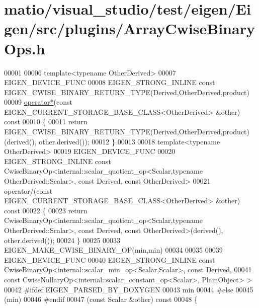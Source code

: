 \hypertarget{matio_2visual__studio_2test_2eigen_2_eigen_2src_2plugins_2_array_cwise_binary_ops_8h_source}{}\section{matio/visual\+\_\+studio/test/eigen/\+Eigen/src/plugins/\+Array\+Cwise\+Binary\+Ops.h}
\label{matio_2visual__studio_2test_2eigen_2_eigen_2src_2plugins_2_array_cwise_binary_ops_8h_source}

\begin{DoxyCode}
00001 
00006 \textcolor{keyword}{template}<\textcolor{keyword}{typename} OtherDerived>
00007 EIGEN\_DEVICE\_FUNC
00008 EIGEN\_STRONG\_INLINE \textcolor{keyword}{const} EIGEN\_CWISE\_BINARY\_RETURN\_TYPE(Derived,OtherDerived,product)
00009 \hyperlink{group___geometry___module_ga8f79e131479dbe709ee1173b1be9a8f0}{operator*}(\textcolor{keyword}{const} EIGEN\_CURRENT\_STORAGE\_BASE\_CLASS<OtherDerived> &other)\textcolor{keyword}{ const}
00010 \textcolor{keyword}{}\{
00011   \textcolor{keywordflow}{return} EIGEN\_CWISE\_BINARY\_RETURN\_TYPE(Derived,OtherDerived,product)(derived(), other.derived());
00012 \}
00013 
00018 \textcolor{keyword}{template}<\textcolor{keyword}{typename} OtherDerived>
00019 EIGEN\_DEVICE\_FUNC
00020 EIGEN\_STRONG\_INLINE \textcolor{keyword}{const} CwiseBinaryOp<internal::scalar\_quotient\_op<Scalar,typename OtherDerived::Scalar>,
       \textcolor{keyword}{const} Derived, \textcolor{keyword}{const} OtherDerived>
00021 operator/(\textcolor{keyword}{const} EIGEN\_CURRENT\_STORAGE\_BASE\_CLASS<OtherDerived> &other)\textcolor{keyword}{ const}
00022 \textcolor{keyword}{}\{
00023   \textcolor{keywordflow}{return} CwiseBinaryOp<internal::scalar\_quotient\_op<Scalar,typename OtherDerived::Scalar>, \textcolor{keyword}{const} Derived, \textcolor{keyword}{
      const} OtherDerived>(derived(), other.derived());
00024 \}
00025 
00033 EIGEN\_MAKE\_CWISE\_BINARY\_OP(min,min)
00034 
00035 
00039 EIGEN\_DEVICE\_FUNC
00040 EIGEN\_STRONG\_INLINE \textcolor{keyword}{const} CwiseBinaryOp<internal::scalar\_min\_op<Scalar,Scalar>, \textcolor{keyword}{const} Derived,
00041                                         \textcolor{keyword}{const} CwiseNullaryOp<internal::scalar\_constant\_op<Scalar>, 
      PlainObject> >
00042 \textcolor{preprocessor}{#ifdef EIGEN\_PARSED\_BY\_DOXYGEN}
00043 min
00044 \textcolor{preprocessor}{#else}
00045 (min)
00046 #endif
00047 (\textcolor{keyword}{const} Scalar &other)\textcolor{keyword}{ const}
00048 \textcolor{keyword}{}\{

\end{DoxyCode}
